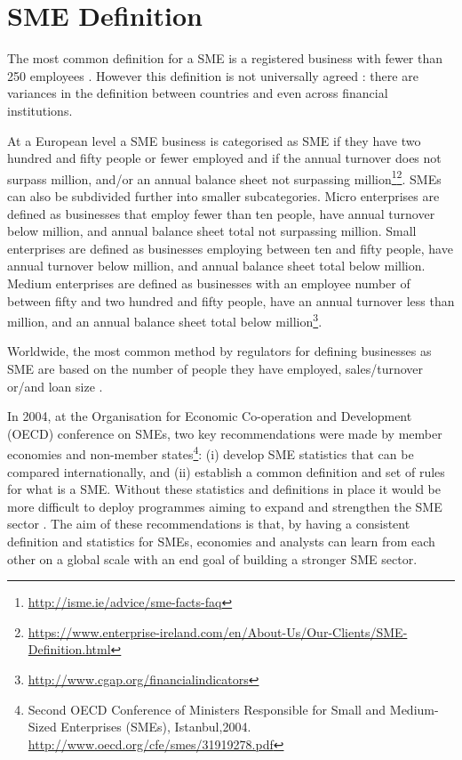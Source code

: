 \section{SME Definition}
The most common definition for a SME is a registered business with fewer than 250 employees \citep{ifc_sme_2009}. However this definition is not universally agreed : there are variances in the definition between countries and even across financial institutions. 

At a European level a SME business is categorised as SME if they have two hundred and fifty people or fewer employed and if the annual turnover does not surpass  million, and/or an annual balance sheet not surpassing  million\footnote{\url{http://isme.ie/advice/sme-facts-faq}}\footnote{\url{https://www.enterprise-ireland.com/en/About-Us/Our-Clients/SME-Definition.html}}. SMEs can also be subdivided further into smaller subcategories. Micro enterprises are defined as businesses that employ fewer than ten people, have annual turnover below  million, and annual balance sheet total not surpassing  million. Small enterprises are defined as businesses employing between ten and fifty people, have annual turnover below  million, and annual balance sheet total below  million. Medium enterprises are defined as businesses with an employee number of between fifty and two hundred and fifty people, have an annual turnover less than  million, and an annual balance sheet total below  million\footnote{\url{http://www.cgap.org/financialindicators}}.

Worldwide, the most common method by regulators for defining businesses as SME are based on the number of people they have employed, sales/turnover or/and loan size \citep{ardic_small_2011}.

In 2004, at the Organisation for Economic Co-operation and Development (OECD) conference on SMEs, two key recommendations were made by member economies and non-member states\footnote{Second OECD Conference of Ministers Responsible for Small and Medium-Sized Enterprises (SMEs), Istanbul,2004. \url{http://www.oecd.org/cfe/smes/31919278.pdf}}: (i) develop SME statistics that can be compared internationally, and (ii) establish a common definition and set of rules for what is a SME. Without these statistics and definitions in place it would be more difficult to deploy programmes aiming to expand and strengthen the SME sector \citep{ardic_small_2011}. The aim of these recommendations is that, by having a consistent definition and statistics for SMEs, economies and analysts can learn from each other on a global scale with an end goal of building a stronger SME sector.


